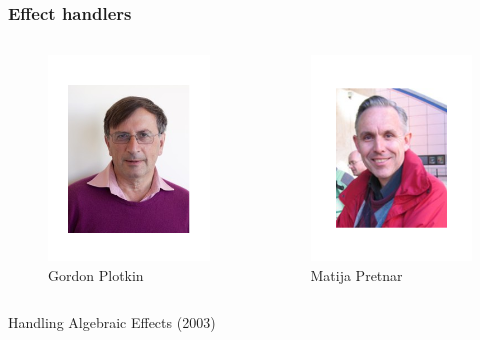 \begin{frame}
  \frametitle{Effect handlers}
  \begin{columns}
    \begin{column}{0.5\textwidth}
      \begin{center}
        \begin{figure}
          \includegraphics[scale=0.3]{figures/gordonplotkin.png}
          \caption{Gordon Plotkin}
        \end{figure}
      \end{center}
    \end{column}
    \begin{column}{0.5\textwidth}
      \begin{center}
        \begin{figure}
          \includegraphics[scale=0.3]{figures/johnpower.png}
          \caption{Matija Pretnar}
        \end{figure}
      \end{center}
    \end{column}
  \end{columns}
  \begin{center}
      Handling Algebraic Effects (2003)
  \end{center}
\end{frame}

